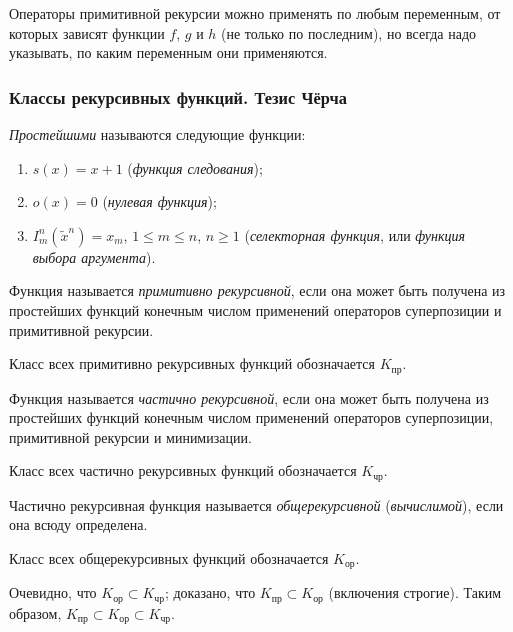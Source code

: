 Операторы примитивной рекурсии можно применять по любым переменным, от которых зависят функции $f$, $g$ и $h$ (не только по последним), но всегда надо указывать, по каким переменным они применяются. 

\subsubsection{Классы рекурсивных функций. Тезис Чёрча}
\begin{definition*}
    \textit{Простейшими} называются следующие функции:
    \begin{enumerate}
        \item $s(x) = x + 1$ (\textit{функция следования});
        \item $o(x) = 0$ (\textit{нулевая функция});
        \item $I_m^n(\widetilde x^n) = x_m$, $1 \leqslant m \leqslant n$, $n \geqslant 1$ (\textit{селекторная функция}, или \textit{функция выбора аргумента}).
    \end{enumerate}
\end{definition*}

\begin{definition*}
    Функция называется \textit{примитивно рекурсивной}, если она может быть получена из простейших функций конечным числом применений операторов суперпозиции и примитивной рекурсии.
\end{definition*}
Класс всех примитивно рекурсивных функций обозначается $K_{\text{пр}}$.

\begin{definition*}
    Функция называется \textit{частично рекурсивной}, если она может быть получена из простейших функций конечным числом применений операторов суперпозиции, примитивной рекурсии и минимизации. 
\end{definition*}
Класс всех частично рекурсивных функций обозначается $K_{\text{чр}}$.

\begin{definition*}
    Частично рекурсивная функция называется \textit{общерекурсивной} (\textit{вычислимой}), если она всюду определена.
\end{definition*}
Класс всех общерекурсивных функций обозначается $K_{\text{ор}}$.

Очевидно, что $K_{\text{ор}} \subset K_{\text{чр}}$; доказано, что $K_{\text{пр}} \subset K_{\text{ор}}$ (включения строгие). Таким образом, $K_{\text{пр}} \subset K_{\text{ор}} \subset K_{\text{чр}}$.

